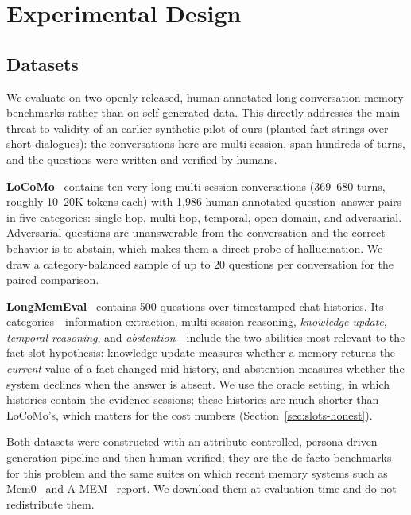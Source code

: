 \documentclass[conference]{IEEEtran}
\begin{document}
\section{Experimental Design}
\label{sec:experiments}

\subsection{Datasets}
\label{sec:datasets}

We evaluate on two openly released, human-annotated long-conversation memory benchmarks rather than on self-generated data. This directly addresses the main threat to validity of an earlier synthetic pilot of ours (planted-fact strings over short dialogues): the conversations here are multi-session, span hundreds of turns, and the questions were written and verified by humans.

\textbf{LoCoMo}~\cite{maharana2024locomo} contains ten very long multi-session conversations (369--680 turns, roughly 10--20K tokens each) with 1{,}986 human-annotated question--answer pairs in five categories: single-hop, multi-hop, temporal, open-domain, and adversarial. Adversarial questions are unanswerable from the conversation and the correct behavior is to abstain, which makes them a direct probe of hallucination. We draw a category-balanced sample of up to 20 questions per conversation for the paired comparison.

\textbf{LongMemEval}~\cite{wu2024longmemeval} contains 500 questions over timestamped chat histories. Its categories---information extraction, multi-session reasoning, \emph{knowledge update}, \emph{temporal reasoning}, and \emph{abstention}---include the two abilities most relevant to the fact-slot hypothesis: knowledge-update measures whether a memory returns the \emph{current} value of a fact changed mid-history, and abstention measures whether the system declines when the answer is absent. We use the oracle setting, in which histories contain the evidence sessions; these histories are much shorter than LoCoMo's, which matters for the cost numbers (Section~\ref{sec:slots-honest}).

Both datasets were constructed with an attribute-controlled, persona-driven generation pipeline and then human-verified; they are the de-facto benchmarks for this problem and the same suites on which recent memory systems such as Mem0~\cite{chhikara2025mem0} and A-MEM~\cite{xu2025amem} report. We download them at evaluation time and do not redistribute them.
\end{document}
